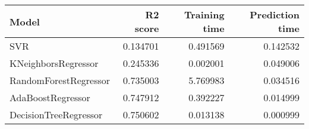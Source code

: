 \begin{tabular}{lrrr}
\toprule
Model & R2 score & Training time & Prediction time \\
\midrule
SVR & 0.134701 & 0.491569 & 0.142532 \\
KNeighborsRegressor & 0.245336 & 0.002001 & 0.049006 \\
RandomForestRegressor & 0.735003 & 5.769983 & 0.034516 \\
AdaBoostRegressor & 0.747912 & 0.392227 & 0.014999 \\
DecisionTreeRegressor & 0.750602 & 0.013138 & 0.000999 \\
\bottomrule
\end{tabular}
